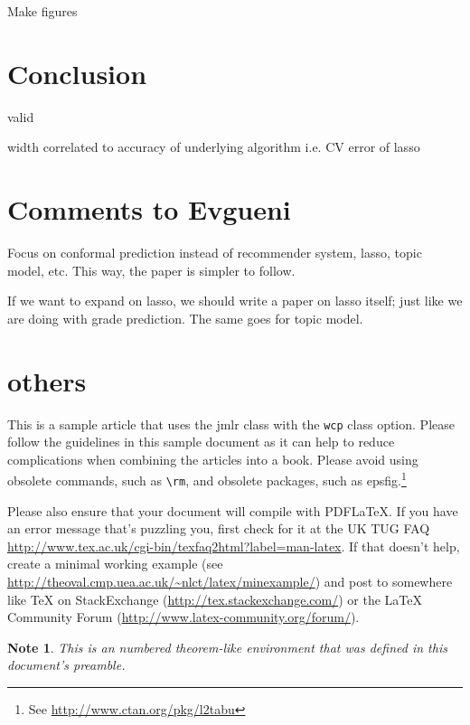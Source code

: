 \documentclass[pmlr]{jmlr}%
\newtheorem*{note}{Note}
\begin{document}
Make figures

\section{Conclusion}
\label{sec:conclusion}

valid

width correlated to accuracy of underlying algorithm i.e. CV error of lasso

\section{Comments to Evgueni}

Focus on conformal prediction instead of recommender system, lasso, topic model, etc. This way, the paper is simpler to follow.

If we want to expand on lasso, we should write a paper on lasso itself; just like we are doing with grade prediction. The same goes for topic model.










\section{others}

This is a sample article that uses the \textsf{jmlr} class with
the \texttt{wcp} class option.  Please follow the guidelines in
this sample document as it can help to reduce complications when
combining the articles into a book. Please avoid using obsolete
commands, such as \verb|\rm|, and obsolete packages, such as
\textsf{epsfig}.\footnote{See
\url{http://www.ctan.org/pkg/l2tabu}}

Please also ensure that your document will compile with PDF\LaTeX.
If you have an error message that's puzzling you, first check for it
at the UK TUG FAQ
\url{http://www.tex.ac.uk/cgi-bin/texfaq2html?label=man-latex}.  If
that doesn't help, create a minimal working example (see
\url{http://theoval.cmp.uea.ac.uk/~nlct/latex/minexample/}) and post
to somewhere like TeX on StackExchange
(\url{http://tex.stackexchange.com/}) or the LaTeX Community Forum
(\url{http://www.latex-community.org/forum/}).

\begin{note}
This is an numbered theorem-like environment that was defined in
this document's preamble.
\end{note}
\end{document}
